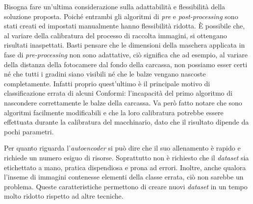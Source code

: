 Bisogna fare un'ultima considerazione sulla adattabilità e flessibilità della soluzione proposta.
Poiché entrambi gli algoritmi di \textit{pre} e \textit{post-processing} sono stati creati ed impostati manualmente hanno flessibilità ridotta.
È possibile che, al variare della calibratura del processo di raccolta immagini, si ottengano risultati inaspettati.
Basti pensare che le dimensioni della maschera applicata in fase di \textit{pre-processing} non sono adattative, ciò significa che ad esempio, al variare della distanza della fotocamere dal fondo della carcassa, non possiamo esser certi né che tutti i gradini siano visibili né che le balze vengano nascoste completamente.
Infatti proprio quest'ultimo è il principale motivo di classificazione errata di alcuni Conformi: l'incapacità del primo algoritmo di nascondere correttamente le balze della carcassa.
Va però fatto notare che sono algoritmi facilmente modificabili e che la loro calibratura potrebbe essere effettuata durante la calibratura del macchinario, dato che il risultato dipende da pochi parametri.

Per quanto riguarda l'\textit{autoencoder} si può dire che il suo allenamento è rapido e richiede un numero esiguo di risorse.
Soprattutto non è richiesto che il \textit{dataset} sia etichettato a mano, pratica dispendiosa e prona ad errori.
Inoltre, anche qualora l'inseme di immagini contenesse elementi della classe errata, ciò non sarebbe un problema.
Queste caratteristiche permettono di creare nuovi \textit{dataset} in un tempo molto ridotto rispetto ad altre tecniche.


